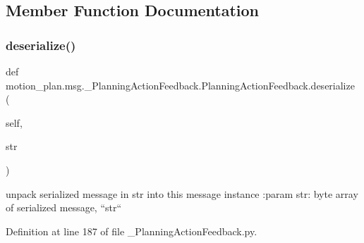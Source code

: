 \subsection{Member Function Documentation}
\mbox{\label{classmotion__plan_1_1msg_1_1__PlanningActionFeedback_1_1PlanningActionFeedback_a54f7831db62c8b167346d9af5a66a311}} 
\subsubsection{\texorpdfstring{deserialize()}{deserialize()}}
{\footnotesize\ttfamily def motion\+\_\+plan.\+msg.\+\_\+\+Planning\+Action\+Feedback.\+Planning\+Action\+Feedback.\+deserialize (\begin{DoxyParamCaption}\item[{}]{self,  }\item[{}]{str }\end{DoxyParamCaption})}

\begin{DoxyVerb}unpack serialized message in str into this message instance
:param str: byte array of serialized message, ``str``
\end{DoxyVerb}
 

Definition at line 187 of file \+\_\+\+Planning\+Action\+Feedback.\+py.


